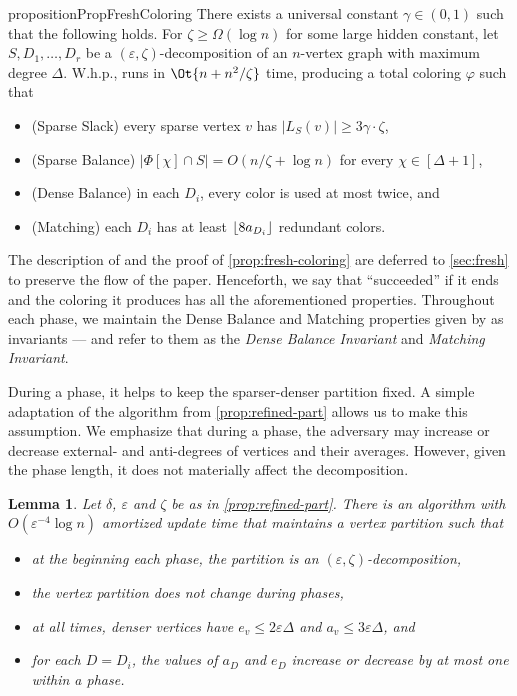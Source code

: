 \documentclass[a4paper,english,11pt]{amsart}
\newtheorem{lemma}{Lemma}[section]
\theoremstyle{definition}
\renewcommand{\leq}{\leqslant}
\renewcommand{\geq}{\geqslant}
\DeclarePairedDelimiter{\floor}{\lfloor}{\rfloor}
\newcommand{\eps}{\varepsilon}
\newcommand{\col}{\varphi}
\newcommand{\LS}{L_{S}}
\begin{document}
\begin{restatable}{proposition}{PropFreshColoring}
    \label{prop:fresh-coloring}
    There exists a universal constant $\gamma \in (0,1)$ such that the following holds.
    For $\zeta \geq \Omega( \log n )$ for some large hidden constant, let $S, D_1, \ldots, D_r$ be a $(\eps, \zeta)$-decomposition of an $n$-vertex graph with maximum degree $\Delta$.
    W.h.p., \FreshColoring runs in $\Ot{ n + n^2 / \zeta }$ time, producing a total coloring $\col$ such that
    \begin{itemize}
        \item (Sparse Slack) every sparse vertex $v$ has $|\LS(v)| \geq 3 \gamma \cdot \zeta$,
\item (Sparse Balance) $|\Phi[\chi] \cap S| = O( n / \zeta + \log n)$ for every $\chi \in [\Delta + 1]$,
        \item (Dense Balance) in each $D_i$, every color is used at most twice, and
        \item (Matching) each $D_i$ has at least $\floor*{ 8 a_{D_i} }$ redundant colors.
    \end{itemize}
\end{restatable}
The description of \FreshColoring and the proof of \cref{prop:fresh-coloring} are deferred to \cref{sec:fresh} to preserve the flow of the paper.
Henceforth, we say that ``\FreshColoring succeeded'' if it ends and the coloring it produces has all the aforementioned properties.
Throughout each phase, we maintain the Dense Balance and Matching properties given by \FreshColoring as invariants --- and refer to them as the \emph{Dense Balance Invariant} and \emph{Matching Invariant}.


During a phase, it helps to keep the sparser-denser partition fixed. A simple adaptation of the algorithm from \cref{prop:refined-part} allows us to make this assumption. We emphasize that during a phase, the adversary may increase or decrease external- and anti-degrees of vertices and their averages. However, given the phase length, it does not materially affect the decomposition.


\begin{lemma}
    \label{lem:dyn-refined-part}
    Let $\delta$, $\eps$ and $\zeta$ be as in \cref{prop:refined-part}.
    There is an algorithm with $O(\eps^{-4} \log n)$ amortized update time that maintains a vertex partition such that
    \begin{itemize}
        \item at the beginning each phase, the partition is an $(\eps,\zeta)$-decomposition,
        \item the vertex partition does not change during phases,
        \item at all times, denser vertices have $e_v \leq 2\eps\Delta$ and $a_v \leq 3\eps\Delta$, and
        \item for each $D = D_i$, the values of $a_D$ and $e_D$ increase or decrease by at most one within a phase.
\end{itemize}
\end{lemma}
\end{document}
